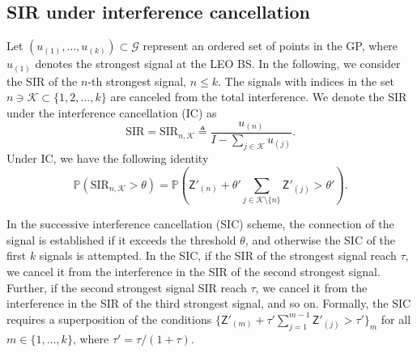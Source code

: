\documentclass[lettersize,journal]{IEEEtran}
\begin{document}
\subsection{SIR under interference cancellation
}
Let $(u_{(1)}, \dots, u_{(k)}) \subset \mathcal{G}$ represent an ordered set of points in the GP, where $u_{(1)}$ denotes the strongest signal at the LEO BS. In the following, we consider the SIR of the $n$-th strongest signal, $n \leq k$. The signals with indices in the set \\$n \ni \mathcal{K} \subset \{1, 2, \dots, k\}$ are canceled from the total interference. We denote the SIR under the interference cancellation (IC) as
\begin{equation}
  \label{eq:IC-SINR}
  \text{SIR}=\text{SIR}_{n,\mathcal{K}} \triangleq \frac{u_{(n)}}{I-\sum_{j \in \mathcal{K} } u_{(j)}}.
\end{equation}
Under IC, we have the following identity
\begin{equation}
   \mathbb{P}(\text{SIR}_{n,\mathcal{K}} > \theta) = \mathbb{P}\left(\mathsf{Z}'_{(n)}+\theta'\sum_{j\in\mathcal{K}\setminus \{n\}}\mathsf{Z}'_{(j)} > \theta'\right).
\end{equation}





In the successive interference cancellation (SIC) scheme, the connection of the signal is established if it exceeds the threshold $\theta$, and otherwise the SIC of the first $k$ signals is attempted. In the SIC, if the SIR of the strongest signal reach $\tau$, we cancel it from the interference in the SIR of the second strongest signal. Further, if the second strongest signal SIR reach $\tau$, we cancel it from the interference in the SIR of the third strongest signal, and so on. Formally, the SIC requires a superposition of the conditions $\{\mathsf{Z}'_{(m)} + \tau' \sum_{j=1}^{m-1}\mathsf{Z}'_{(j)}> \tau'\}_m$ for all $m \in \{1,\dots,k\}$, where $\tau' = \tau/(1+\tau)$.
\end{document}
